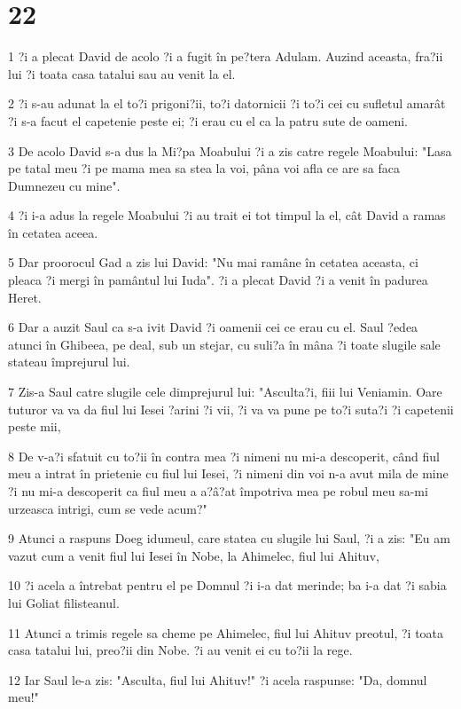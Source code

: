 \chapter{22}

\par 1 ?i a plecat David de acolo ?i a fugit în pe?tera Adulam. Auzind aceasta, fra?ii lui ?i toata casa tatalui sau au venit la el.
\par 2 ?i s-au adunat la el to?i prigoni?ii, to?i datornicii ?i to?i cei cu sufletul amarât ?i s-a facut el capetenie peste ei; ?i erau cu el ca la patru sute de oameni.
\par 3 De acolo David s-a dus la Mi?pa Moabului ?i a zis catre regele Moabului: "Lasa pe tatal meu ?i pe mama mea sa stea la voi, pâna voi afla ce are sa faca Dumnezeu cu mine".
\par 4 ?i i-a adus la regele Moabului ?i au trait ei tot timpul la el, cât David a ramas în cetatea aceea.
\par 5 Dar proorocul Gad a zis lui David: "Nu mai ramâne în cetatea aceasta, ci pleaca ?i mergi în pamântul lui Iuda". ?i a plecat David ?i a venit în padurea Heret.
\par 6 Dar a auzit Saul ca s-a ivit David ?i oamenii cei ce erau cu el. Saul ?edea atunci în Ghibeea, pe deal, sub un stejar, cu suli?a în mâna ?i toate slugile sale stateau împrejurul lui.
\par 7 Zis-a Saul catre slugile cele dimprejurul lui: "Asculta?i, fiii lui Veniamin. Oare tuturor va va da fiul lui Iesei ?arini ?i vii, ?i va va pune pe to?i suta?i ?i capetenii peste mii,
\par 8 De v-a?i sfatuit cu to?ii în contra mea ?i nimeni nu mi-a descoperit, când fiul meu a intrat în prietenie cu fiul lui Iesei, ?i nimeni din voi n-a avut mila de mine ?i nu mi-a descoperit ca fiul meu a a?â?at împotriva mea pe robul meu sa-mi urzeasca intrigi, cum se vede acum?"
\par 9 Atunci a raspuns Doeg idumeul, care statea cu slugile lui Saul, ?i a zis: "Eu am vazut cum a venit fiul lui Iesei în Nobe, la Ahimelec, fiul lui Ahituv,
\par 10 ?i acela a întrebat pentru el pe Domnul ?i i-a dat merinde; ba i-a dat ?i sabia lui Goliat filisteanul.
\par 11 Atunci a trimis regele sa cheme pe Ahimelec, fiul lui Ahituv preotul, ?i toata casa tatalui lui, preo?ii din Nobe. ?i au venit ei cu to?ii la rege.
\par 12 Iar Saul le-a zis: "Asculta, fiul lui Ahituv!" ?i acela raspunse: "Da, domnul meu!"
